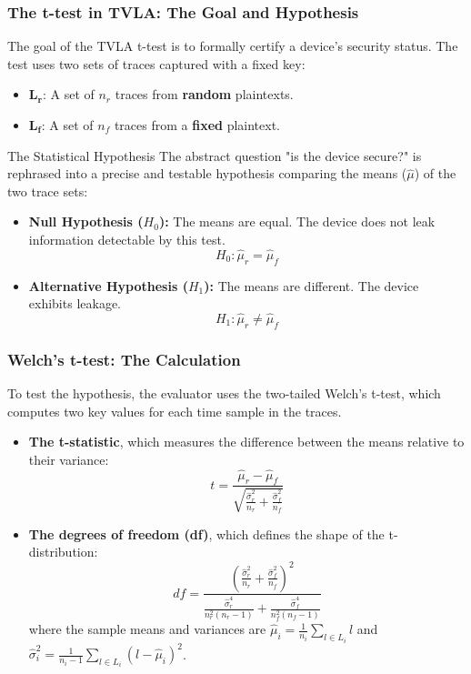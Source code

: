 \begin{frame}
    \frametitle{The t-test in TVLA: The Goal and Hypothesis}

    The goal of the TVLA t-test is to formally certify a device's security status. The test uses two sets of traces captured with a fixed key:
    \begin{itemize}
        \item $\mathbf{L_r}$: A set of $n_r$ traces from \textbf{random} plaintexts.
        \item $\mathbf{L_f}$: A set of $n_f$ traces from a \textbf{fixed} plaintext.
    \end{itemize}
    
    \begin{block}{The Statistical Hypothesis}
        The abstract question "is the device secure?" is rephrased into a precise and testable hypothesis comparing the means ($\hat{\mu}$) of the two trace sets:
        
        \begin{itemize}
            \item \textbf{Null Hypothesis ($H_0$):} The means are equal. The device does not leak information detectable by this test.
            \[ H_0 : \hat{\mu}_r = \hat{\mu}_f \]
            \item \textbf{Alternative Hypothesis ($H_1$):} The means are different. The device exhibits leakage.
            \[ H_1 : \hat{\mu}_r \neq \hat{\mu}_f \]
        \end{itemize}
    \end{block}
\end{frame}

\begin{frame}
    \frametitle{Welch's t-test: The Calculation}

    To test the hypothesis, the evaluator uses the two-tailed Welch's t-test, which computes two key values for each time sample in the traces.

    \begin{block}{}
    \begin{itemize}
        \item \textbf{The t-statistic}, which measures the difference between the means relative to their variance:
        \[ t = \frac{ \hat{\mu}_r - \hat{\mu}_f }{ \sqrt{ \frac{\hat{\sigma}_r^2}{n_r} + \frac{\hat{\sigma}_f^2}{n_f} } } \]
        
        \item \textbf{The degrees of freedom (df)}, which defines the shape of the t-distribution:
        \[ df = \frac{ \left( \frac{\hat{\sigma}_r^2}{n_r} + \frac{\hat{\sigma}_f^2}{n_f} \right)^2 }{ \frac{\hat{\sigma}_r^4}{n_r^2(n_r-1)} + \frac{\hat{\sigma}_f^4}{n_f^2(n_f-1)} } \]
        where the sample means and variances are $\hat{\mu}_i = \frac{1}{n_i}\sum_{l \in L_i} l$ and $\hat{\sigma}_i^2 = \frac{1}{n_i-1}\sum_{l \in L_i} (l - \hat{\mu}_i)^2$.
    \end{itemize}
    \end{block}
\end{frame}

